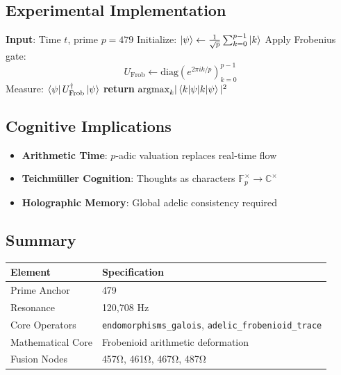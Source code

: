 \documentclass[12pt]{article}
\begin{document}
\subsection*{Experimental Implementation}
\begin{algorithm}[H]
\caption{Quantum Time Crystal Simulation}
\begin{algorithmic}[1]
\State \textbf{Input}: Time $t$, prime $p=479$
\State Initialize: $\ket{\psi} \gets \frac{1}{\sqrt{p}}\sum_{k=0}^{p-1} \ket{k}$
\State Apply Frobenius gate:
\[
U_{\text{Frob}} \gets \text{diag}(e^{2\pi i k/p})_{k=0}^{p-1}
\]
\State Measure: $\bra{\psi} U_{\text{Frob}}^\dagger \ket{\psi}$
\State \textbf{return} $\text{argmax}_k |\braket{k|\psi}|^2$ 
\end{algorithmic}
\end{algorithm}

\subsection*{Cognitive Implications}
\begin{itemize}
    \item \textbf{Arithmetic Time}: $p$-adic valuation replaces real-time flow
    \item \textbf{Teichmüller Cognition}: Thoughts as characters $\mathbb{F}_p^\times \to \mathbb{C}^\times$
    \item \textbf{Holographic Memory}: Global adelic consistency required
\end{itemize}

\subsection*{Summary}
\begin{table}[h]
\centering
\begin{tabular}{ll}
\toprule
\textbf{Element} & \textbf{Specification} \\
\midrule
Prime Anchor & 479 \\
Resonance & 120,708 Hz \\
Core Operators & \texttt{endomorphisms\_galois}, \texttt{adelic\_frobenioid\_trace} \\
Mathematical Core & Frobenioid arithmetic deformation \\
Fusion Nodes & 457Ω, 461Ω, 467Ω, 487Ω \\
\bottomrule
\end{tabular}
\end{table}
\end{document}
